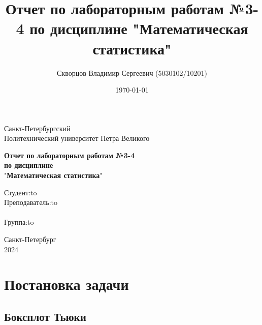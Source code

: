 \documentclass[12pt,a4paper]{article}
\title{Отчет по лабораторным работам №3-4 по дисциплине "Математическая статистика"}
\author{Скворцов Владимир Сергеевич (5030102/10201)}
\date{\today}
\begin{document}
	\begin{titlepage}

		\Large

		\begin{center}
			Санкт-Петербургский \\ Политехнический университет Петра Великого

			\vspace{10em}

			\textbf{Отчет по лабораторным работам №3-4} \\
			\textbf{по дисциплине}\\
			"\textbf{Математическая статистика}"

			\vspace{2em}

		\end{center}

		\vspace{6em}

		\newbox{\lbox}
		\newlength{\maxl}
		\setlength{\maxl}{\wd\lbox}
		\hfill\parbox{12cm}{
			\hspace*{3cm}\hspace*{-5cm}Студент:\hfill\hbox to\\
			\hspace*{3cm}\hspace*{-5cm}Преподаватель:\hfill\hbox to\\
			\\
			\hspace*{3cm}\hspace*{-5cm}Группа:\hfill\hbox to\\
		}

		\vspace{\fill}

		\begin{center}
			Санкт-Петербург \\ 2024
		\end{center}

	\end{titlepage}

	\tableofcontents\newpage

	\section{Постановка задачи}

	\subsection{Боксплот Тьюки}
\end{document}
